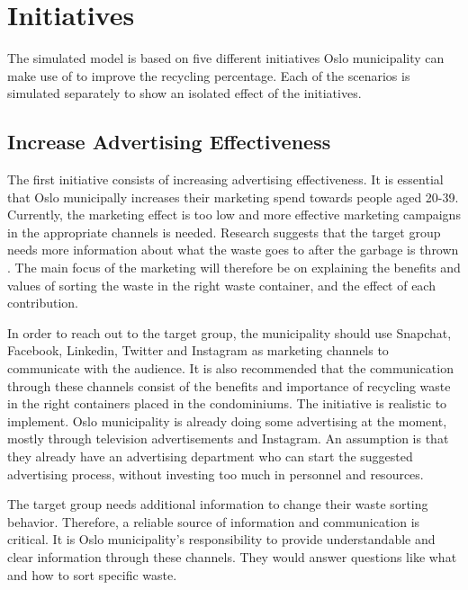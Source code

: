\section{Initiatives}

\indent \newline
The simulated model is based on five different initiatives Oslo municipality can make use of to improve the recycling percentage. Each of the scenarios is simulated separately to show an isolated effect of the initiatives.

\subsection{Increase Advertising Effectiveness}

\indent \newline
The first initiative consists of increasing advertising effectiveness. It is essential that Oslo municipally increases their marketing spend towards people aged 20-39. Currently, the marketing effect is too low and more effective marketing campaigns in the appropriate channels is needed. Research suggests that the target group needs more information about what the waste goes to after the garbage is thrown \cite[p. 72]{recycling}. The main focus of the marketing will therefore be on explaining the benefits and values of sorting the waste in the right waste container, and the effect of each contribution. 

\indent \newline
In order to reach out to the target group, the municipality should use Snapchat, Facebook, Linkedin, Twitter and Instagram as marketing channels to communicate with the audience. It is also recommended that the communication through these channels consist of the benefits and importance of  recycling waste in the right containers placed in the condominiums. 
The initiative is realistic to implement. Oslo municipality is already doing some advertising at the moment, mostly through television advertisements and Instagram. An assumption is that they already have an advertising department who can start the suggested advertising process, without investing too much in personnel and resources. 

\indent \newline
The target group needs additional information to change their waste sorting behavior. Therefore, a reliable source of information and communication is critical. It is Oslo municipality's responsibility to provide understandable and clear information through these channels. They would answer questions like what and how to sort specific waste. 


